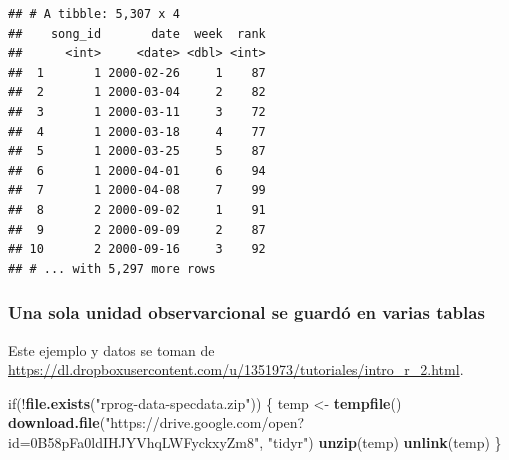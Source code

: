 \documentclass[]{article}
\newenvironment{Shaded}{\begin{snugshade}}{\end{snugshade}}
\newcommand{\KeywordTok}[1]{\textcolor[rgb]{0.13,0.29,0.53}{\textbf{{#1}}}}
\newcommand{\StringTok}[1]{\textcolor[rgb]{0.31,0.60,0.02}{{#1}}}
\newcommand{\NormalTok}[1]{{#1}}
\begin{document}
\begin{Shaded}
\end{Shaded}

\begin{verbatim}
## # A tibble: 5,307 x 4
##    song_id       date  week  rank
##      <int>     <date> <dbl> <int>
##  1       1 2000-02-26     1    87
##  2       1 2000-03-04     2    82
##  3       1 2000-03-11     3    72
##  4       1 2000-03-18     4    77
##  5       1 2000-03-25     5    87
##  6       1 2000-04-01     6    94
##  7       1 2000-04-08     7    99
##  8       2 2000-09-02     1    91
##  9       2 2000-09-09     2    87
## 10       2 2000-09-16     3    92
## # ... with 5,297 more rows
\end{verbatim}

\subsubsection{Una sola unidad observarcional se guardó en varias
tablas}\label{una-sola-unidad-observarcional-se-guardo-en-varias-tablas}

Este ejemplo y datos se toman de
\url{https://dl.dropboxusercontent.com/u/1351973/tutoriales/intro_r_2.html}.

\begin{Shaded}
\begin{Highlighting}[]
\NormalTok{if(!}\KeywordTok{file.exists}\NormalTok{(}\StringTok{"rprog-data-specdata.zip"}\NormalTok{)) \{}
        \NormalTok{temp <-}\StringTok{ }\KeywordTok{tempfile}\NormalTok{()}
        \KeywordTok{download.file}\NormalTok{(}\StringTok{"https://drive.google.com/open?id=0B58pFa0ldIHJYVhqLWFyckxyZm8"}\NormalTok{, }\StringTok{"tidyr"}\NormalTok{)}
        \KeywordTok{unzip}\NormalTok{(temp)}
        \KeywordTok{unlink}\NormalTok{(temp)}
\NormalTok{\}}
\end{Highlighting}
\end{Shaded}
\end{document}
